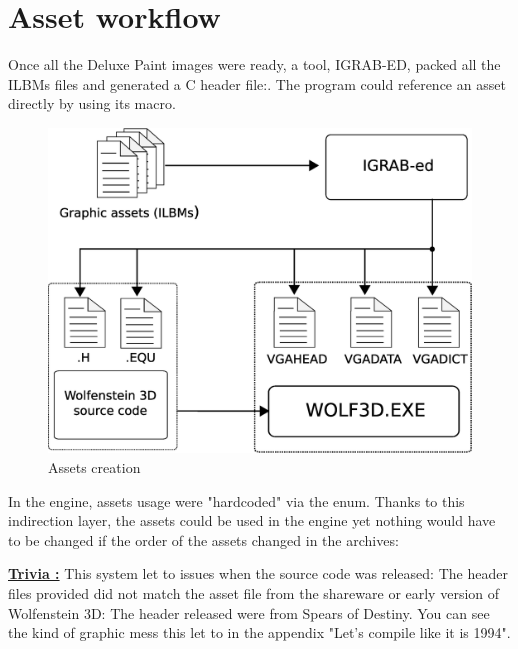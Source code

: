 \documentclass[book.tex]{subfiles}
\begin{document}
\section{Asset workflow}
Once all the Deluxe Paint images were ready, a tool, IGRAB-ED, packed all the ILBMs files and generated a C header file:. The program could reference an asset directly by using its macro.\\
\begin{figure}[H]
\centering
 \includegraphics[width=\textwidth]{imgs/drawings/drawing_plain.eps}
 \caption{Assets creation} 
 \end{figure}

\begin{minipage}{\textwidth}
 \par
 \end{minipage}
 
 In the engine, assets usage were "hardcoded" via the enum. Thanks to this indirection layer, the assets could be used in the engine yet nothing would have to be changed if the order of the assets changed in the  archives:\\
 \par
 \begin{minipage}{\textwidth}
 \par
 \end{minipage}
\par
\textbf{\underline{Trivia :}} This system let to issues when the source code was released: The  header files provided did not match the asset file from the shareware or early version of Wolfenstein 3D: The header released were from Spears of Destiny. You can see the kind of graphic mess this let to in the appendix "Let's compile like it is 1994".\\
\end{document}
